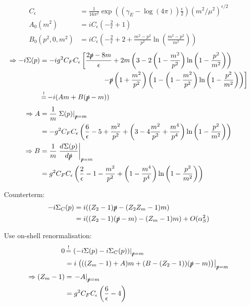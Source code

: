 \begin{align}
C_\epsilon &= \frac 1 {16\pi^2}\exp\left(\left(\gamma_E-\log(4\pi)\right)\frac{\epsilon} 2\right)\left(m^2/\mu^2\right)^{\epsilon/2}\\
A_0(m^2) &=iC_\epsilon\left(-\frac 2 {\epsilon}+1\right)\\
B_0(p^2,0,m^2) &=iC_\epsilon\left(-\frac 2{\epsilon}+2+\frac{m^2-p^2}{p^2}\ln\left(\frac{m^2-p^2}{m^2}\right)\right)
\end{align}
\begin{align}
\Rightarrow-i\Sigma(p) &= -ig^2C_FC_\epsilon\left[\frac{2\slashed{p}-8m}{\epsilon}+2m\left(3-2\left(1-\frac{m^2}{p^2}\right)\ln\left(1-\frac{p^2}{m^2}\right)\right)\right.\nonumber\\
 &\hspace{90pt}\left.-\slashed{p}\left(1+\frac{m^2}{p^2}\right)\left(1-\left(1-\frac{m^2}{p^2}\right)\ln\left(1-\frac{p^2}{m^2}\right)\right)\right]\\
 &\EqualClaim -i(A m + B(\slashed p - m))
\end{align}
\begin{align}
\Rightarrow A &= \frac 1 m \left.\Sigma(p)\right|_{\slashed{p}=m} \\
 &= -g^2C_F C_\epsilon\left(\frac 6 \epsilon -5 +\frac{m^2}{p^2}+\left(3-4\frac{m^2}{p^2}+\frac{m^4}{p^4}\right)\ln\left(1-\frac{p^2}{m^2}\right)\right)\\
\Rightarrow B &= \frac 1 m \left.\DeriveF{\slashed{p}}{\Sigma(p)}\right|_{\slashed{p}=m} \\
 &= g^2C_F C_\epsilon\left(\frac 2 \epsilon -1-\frac{m^2}{p^2}+\left(1-\frac{m^4}{p^4}\right)\ln\left(1-\frac{p^2}{m^2}\right)\right)
\end{align}

Counterterm:
\begin{align}
-i\Sigma_C(p) &=i((Z_2-1)\slashed{p}-(Z_2 Z_m -1) m)\\
 &= i((Z_2-1)(\slashed p - m) - (Z_m-1)m) + O(\alpha_S^2)
\end{align}

Use on-shell renormalisation:
\begin{align}
0 &\EqualClaim \left.\left(-i\Sigma(p)-i\Sigma_C(p)\right)\right|_{\slashed{p}=m}\\
 &= i\left.\left(((Z_m-1)+A)m+(B-(Z_2-1))(\slashed p - m)\right)\right|_{\slashed{p}=m} \\
\Rightarrow (Z_m-1) &= \left.-A\right|_{\slashed{p}=m}\\
 &= g^2C_F C_\epsilon\left(\frac 6 \epsilon -4\right)
\end{align}
